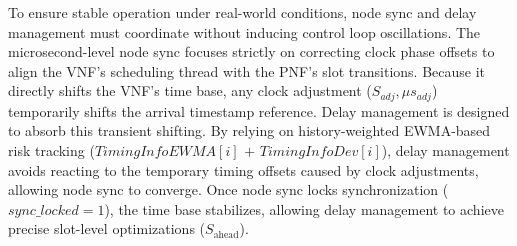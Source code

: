 \documentclass[../my_ntust_thesis.tex]{subfiles}
\begin{document}
\begin{algorithm}[!htbp]
\caption{Delay Management}
\label{alg:delay_management}
\small
{}
\end{algorithm}

To ensure stable operation under real-world conditions, node sync and delay management must coordinate without inducing control loop oscillations. The microsecond-level node sync focuses strictly on correcting clock phase offsets to align the VNF's scheduling thread with the PNF's slot transitions. Because it directly shifts the VNF's time base, any clock adjustment ($S_{adj}, \mu s_{adj}$) temporarily shifts the arrival timestamp reference. Delay management is designed to absorb this transient shifting. By relying on history-weighted EWMA-based risk tracking ($\mathit{TimingInfoEWMA}[i]$ $+$ $\mathit{TimingInfoDev}[i]$), delay management avoids reacting to the temporary timing offsets caused by clock adjustments, allowing node sync to converge. Once node sync locks synchronization ($\mathit{sync\_locked} = 1$), the time base stabilizes, allowing delay management to achieve precise slot-level optimizations ($S_{\mathrm{ahead}}$).
\end{document}
